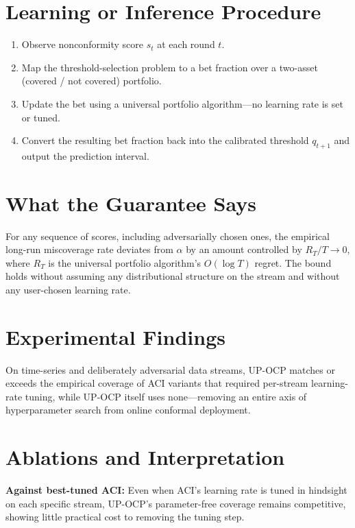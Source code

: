 \documentclass[10pt,twocolumn]{article}
\begin{document}
\section{Learning or Inference Procedure}

\begin{enumerate}[itemsep=2pt,parsep=0pt]
  \item Observe nonconformity score $s_t$ at each round $t$.
  \item Map the threshold-selection problem to a bet fraction over a
    two-asset (covered / not covered) portfolio.
  \item Update the bet using a universal portfolio algorithm---no
    learning rate is set or tuned.
  \item Convert the resulting bet fraction back into the calibrated
    threshold $q_{t+1}$ and output the prediction interval.
\end{enumerate}

\section{What the Guarantee Says}

For any sequence of scores, including adversarially chosen ones, the
empirical long-run miscoverage rate deviates from $\alpha$ by an amount
controlled by $R_T/T \to 0$, where $R_T$ is the universal portfolio
algorithm's $O(\log T)$ regret. The bound holds without assuming any
distributional structure on the stream and without any user-chosen
learning rate.

\section{Experimental Findings}

On time-series and deliberately adversarial data streams, UP-OCP
matches or exceeds the empirical coverage of ACI variants that required
per-stream learning-rate tuning, while UP-OCP itself uses none---removing
an entire axis of hyperparameter search from online conformal
deployment.

\section{Ablations and Interpretation}

\textbf{Against best-tuned ACI:} Even when ACI's learning rate is
tuned in hindsight on each specific stream, UP-OCP's parameter-free
coverage remains competitive, showing little practical cost to removing
the tuning step.
\end{document}
